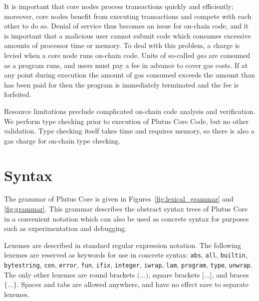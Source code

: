 \documentclass[a4paper]{article}
\begin{document}
It is important that core nodes process transactions quickly and
efficiently; moreover, core nodes benefit from executing transactions
and compete with each other to do so.  Denial of service thus becomes
an issue for on-chain code, and it is important that a malicious user
cannot submit code which consumes excessive amounts of processor time
or memory. To deal with this problem, a charge is levied when a core
node runs on-chain code.  Units of so-called \textit{gas} are consumed
as a program runs, and users must pay a fee in advance to cover gas
costs.  If at any point during execution the amount of gas consumed
exceeds the amount than has been paid for then the program is
immediately terminated and the fee is forfeited.

Resource limitations preclude complicated on-chain code analysis
and verification.  We perform type checking prior to execution of
Plutus Core Code, but no other validation.  Type checking itself takes
time and requires memory, so there is also a gas charge for on-chain
type checking.



\section{Syntax}

The grammar of Plutus Core is given in
Figures~\ref{fig:lexical_grammar} and
\ref{fig:grammar}. This grammar describes the abstract
syntax trees of Plutus Core in a convenient notation which can also be
used as concrete syntax for purposes such as experimentation and
debugging.

Lexemes are described in standard regular expression notation.  The
following lexemes are reserved as keywords for use in concrete syntax:
\texttt{abs}, \texttt{all}, \texttt{builtin}, \texttt{bytestring},
\texttt{con}, \texttt{error}, \texttt{fun}, \texttt{ifix},
\texttt{integer}, \texttt{iwrap}, \texttt{lam}, \texttt{program},
\texttt{type}, \texttt{unwrap}.  The only other lexemes
are round brackets $\texttt{(}\ldots\texttt{)}$, square brackets
$\texttt{[}\ldots\texttt{]}$, and braces
$\texttt{\{}\ldots\texttt{\}}$.  Spaces and tabs are allowed anywhere,
and have no effect save to separate lexemes.
\end{document}
